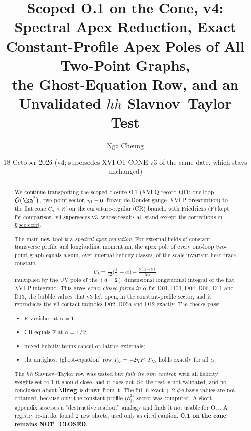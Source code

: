 \newcommand{\Ccb}{\mathcal C}
\title{Scoped O.1 on the Cone, v4:\\ Spectral Apex Reduction, Exact Constant-Profile Apex Poles of All Two-Point Graphs,\\ the Ghost-Equation Row, and an Unvalidated $hh$ Slavnov--Taylor Test}
\author{Ngo Cheung}
\date{18 October 2026 (v4; supersedes XVI-O1-CONE v3 of the same date, which stays unchanged)}

\sloppy
\maketitle
\begin{abstract}
We continue transporting the scoped closure O.1 (XVI-Q record Q11: one loop, $O(\ka^2)$, two-point sector, $m=0$, frozen de Donder gauge, XVI-P prescription) to the flat cone $C_\alpha\times\mathbb R^2$ on the curvature-regular (CR) branch, with Friedrichs (F) kept for comparison. v4 supersedes v3, whose results all stand except the corrections in \S\ref{sec:corr}.

The main new tool is a \emph{spectral apex reduction}. For external fields of constant transverse profile and longitudinal momentum, the apex pole of every one-loop two-point graph equals a sum, over internal helicity classes, of the scale-invariant heat-trace constant
\[\Ccb_b=\tfrac1{12}\big(\tfrac1\alpha-\alpha\big)-\tfrac{b(1-b)}{2\alpha}\]
multiplied by the UV pole of the $(d-2)$-dimensional longitudinal integral of the flat XVI-P integrand. This gives \emph{exact closed forms in $\alpha$} for D01, D03, D04, D06, D11 and D13, the bubble values that v3 left open, in the constant-profile sector, and it reproduces the v3 contact tadpoles D02, D05a and D12 exactly. The checks pass:
\begin{itemize}
\item F vanishes at $\alpha=1$;
\item CR equals F at $\alpha=1/2$;
\item mixed-helicity terms cancel on lattice externals;
\item the antighost (ghost-equation) row $\Gamma_{\bar cc}=-2\eta\,F\cdot\Gamma_{Kc}$ holds exactly for all $\alpha$.
\end{itemize}
The $hh$ Slavnov--Taylor row was tested but \emph{fails its own control}: with all helicity weights set to 1 it should close, and it does not. So the test is not validated, and no conclusion about $\Hreg$ is drawn from it. The full 6 exact $+$ 2 $\phi\phi$ basis values are not obtained, because only the constant-profile ($\partial_\parallel^2$) sector was computed. A short appendix assesses a ``destructive readout'' analogy and finds it not usable for O.1. A registry re-intake found 2 new sheets, used only as cited caution. \textbf{O.1 on the cone remains NOT\_CLOSED.}
\end{abstract}

